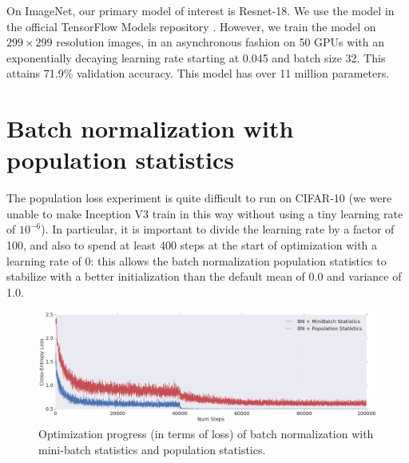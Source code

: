 \documentclass{article}
\begin{document}
On ImageNet, our primary model of interest is Resnet-18. We use the model in the official TensorFlow Models repository \cite{inceptionaugmentation}. However, we train the model on $299\times299$ resolution images, in an asynchronous fashion on 50 GPUs with an exponentially decaying learning rate starting at 0.045 and batch size 32. This attains 71.9\% validation accuracy. This model has over 11 million parameters.

\section{Batch normalization with population statistics}
\label{app:population_bn}
The population loss experiment is quite difficult to run on CIFAR-10 (we were unable to make Inception V3 train in this way without using a tiny learning rate of $10^{-6}$). In particular, it is important to divide the learning rate by a factor of 100, and also to spend at least 400 steps at the start of optimization with a learning rate of 0: this allows the batch normalization population statistics to stabilize with a better initialization than the default mean of 0.0 and variance of 1.0. 
\begin{figure}[h]
\includegraphics[width=\textwidth]{pop_loss.png}
\vspace{-0.5cm}
\caption{Optimization progress (in terms of loss) of batch normalization with mini-batch statistics and population statistics. \label{fig:bn_population_losses}}
\end{figure}
\end{document}
